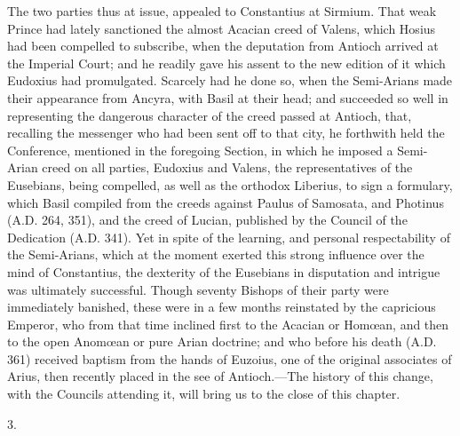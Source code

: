 The two parties thus at issue, appealed to Constantius at Sirmium.
That weak Prince had lately sanctioned the almost Acacian creed of
Valens, which Hosius had been compelled to subscribe, when the
deputation from Antioch arrived at the Imperial Court; and he readily
gave his assent to the new edition of it which Eudoxius had
promulgated. Scarcely had he done so, when the Semi-Arians made their
appearance from Ancyra, with Basil at their head; and succeeded so
well in representing the dangerous character of the creed passed at
Antioch, that, recalling the messenger who had been sent off to that
city, he forthwith held the Conference, mentioned in the foregoing
Section, in which he imposed a Semi-Arian creed on all parties,
Eudoxius and Valens, the representatives of the Eusebians, being
compelled, as well as the orthodox Liberius, to sign a formulary,
which Basil compiled from the creeds against Paulus of Samosata, and
Photinus (A.D. 264, 351), and the creed of
Lucian, published by the Council of the Dedication (A.D.
341). Yet in spite of the learning, and personal respectability of the
Semi-Arians, which at the moment exerted this strong influence over
the mind of Constantius, the dexterity of the Eusebians in disputation
and intrigue was ultimately successful. Though seventy Bishops
of their party were immediately banished, these were in a few months
reinstated by the capricious Emperor, who from that time inclined
first to the Acacian or Homœan, and then to the open Anomœan or pure
Arian doctrine; and who before his death (A.D.
361) received baptism from the hands of Euzoius, one of the original
associates of Arius, then recently placed in the see of Antioch.—The
history of this change, with the Councils attending it, will bring us
to the close of this chapter.

3.

